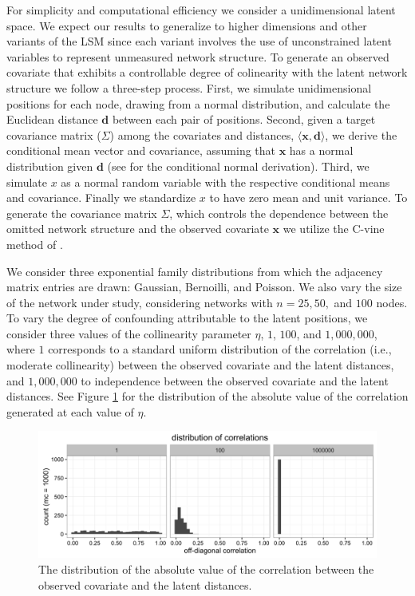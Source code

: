 \documentclass[11pt]{article}
\begin{document}
For simplicity and computational efficiency we consider a unidimensional latent space. We expect our results to generalize to higher dimensions and other variants of the LSM since each variant involves the use of unconstrained latent variables to represent unmeasured network structure. To generate an observed covariate that exhibits a controllable degree of colinearity with the latent network structure we follow a three-step process. First, we simulate unidimensional positions for each node, drawing from a normal distribution, and calculate the Euclidean distance $\mathbf{d}$ between each pair of positions. Second, given a target covariance matrix ($\Sigma$) among the covariates and distances, $\langle \mathbf{x}, \mathbf{d} \rangle$, we derive the conditional mean vector and covariance, assuming that $\mathbf{x}$ has a normal distribution given $\mathbf{d}$ (see \cite[pp. 116--117]{eaton1983} for the conditional normal derivation). Third, we simulate $x$ as a normal random variable with the respective conditional means and covariance. Finally we standardize $x$ to have zero mean and unit variance. To generate the covariance matrix $\Sigma$, which controls the dependence between the omitted network structure and the observed covariate $\mathbf{x}$ we utilize the C-vine method of \cite{lewandowski2009generating}. %

We consider three exponential family distributions from which the adjacency matrix entries are drawn: Gaussian, Bernoilli, and Poisson. We also vary the size of the network under study, considering networks with $n = 25, 50,$ and $100$ nodes. To vary the degree of confounding attributable to the latent positions, we consider three values of the collinearity parameter $\eta$, $1$, $100$, and $1,000,000$, where $1$ corresponds to a standard uniform distribution of the correlation  (i.e.,  moderate collinearity) between the observed covariate and the latent distances, and $1,000,000$ to independence between the observed covariate and the latent distances. See Figure \ref{fig:vine} for the distribution of the absolute value of the correlation generated at each value of $\eta$.

\begin{figure}
\includegraphics[width=\textwidth]{figures/max_r_vine.png}
\caption{The distribution of the absolute value of the correlation between the observed covariate and the latent distances. \label{fig:vine}}
\end{figure}
\end{document}
